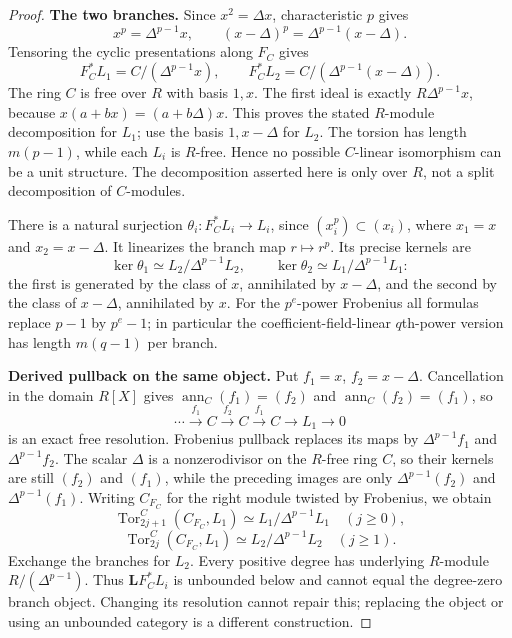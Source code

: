 \begin{proof}
\par\smallskip\noindent\textbf{The two branches.}\quad
Since $x^2=\Delta x$, characteristic $p$ gives
\[
 x^p=\Delta^{p-1}x,\qquad
 (x-\Delta)^p=\Delta^{p-1}(x-\Delta).
\]
Tensoring the cyclic presentations along $F_C$ gives
\[
 F_C^*L_1=C/(\Delta^{p-1}x),\qquad
 F_C^*L_2=C/(\Delta^{p-1}(x-\Delta)).
\]
The ring $C$ is free over $R$ with basis $1,x$. The first ideal is
exactly $R\Delta^{p-1}x$, because
$x(a+bx)=(a+b\Delta)x$. This proves the stated $R$-module
decomposition for $L_1$; use the basis $1,x-\Delta$ for $L_2$.
The torsion has length $m(p-1)$, while each $L_i$ is $R$-free.
Hence no possible $C$-linear isomorphism can be a unit structure.
The decomposition asserted here is only over $R$, not a split
decomposition of $C$-modules.

There is a natural surjection $\theta_i:F_C^*L_i\to L_i$,
since $(x_i^p)\subset(x_i)$, where $x_1=x$ and $x_2=x-\Delta$.
It linearizes the branch map $r\mapsto r^p$. Its precise kernels are
\[
 \ker\theta_1\simeq L_2/\Delta^{p-1}L_2,
 \qquad \ker\theta_2\simeq L_1/\Delta^{p-1}L_1:
\]
the first is generated by the class of $x$, annihilated by $x-\Delta$,
and the second by the class of $x-\Delta$, annihilated by $x$.
For the $p^e$-power Frobenius all formulas replace $p-1$ by
$p^e-1$; in particular the coefficient-field-linear $q$th-power
version has length $m(q-1)$ per branch.

\par\smallskip\noindent\textbf{Derived pullback on the same object.}\quad
Put $f_1=x$, $f_2=x-\Delta$. Cancellation in the domain $R[X]$
gives $\operatorname{ann}_C(f_1)=(f_2)$ and
$\operatorname{ann}_C(f_2)=(f_1)$, so
\[
 \cdots\xrightarrow{f_1}C\xrightarrow{f_2}C
       \xrightarrow{f_1}C\longrightarrow L_1\longrightarrow0
\]
is an exact free resolution. Frobenius pullback replaces its maps by
$\Delta^{p-1}f_1$ and $\Delta^{p-1}f_2$.
The scalar $\Delta$ is a nonzerodivisor on the $R$-free ring $C$,
so their kernels are still $(f_2)$ and $(f_1)$, while the preceding
images are only $\Delta^{p-1}(f_2)$ and $\Delta^{p-1}(f_1)$.
Writing $C_{F_C}$ for the right module twisted by Frobenius, we obtain
\[
 \operatorname{Tor}^{C}_{2j+1}(C_{F_C},L_1)
     \simeq L_1/\Delta^{p-1}L_1\quad(j\ge0),
\]
\[
 \operatorname{Tor}^{C}_{2j}(C_{F_C},L_1)
     \simeq L_2/\Delta^{p-1}L_2\quad(j\ge1).
\]
Exchange the branches for $L_2$. Every positive degree has
underlying $R$-module $R/(\Delta^{p-1})$.
Thus $\mathbf L F_C^*L_i$ is unbounded below and cannot equal the
degree-zero branch object. Changing its resolution cannot repair
this; replacing the object or using an unbounded category is a
different construction.


\end{proof}
